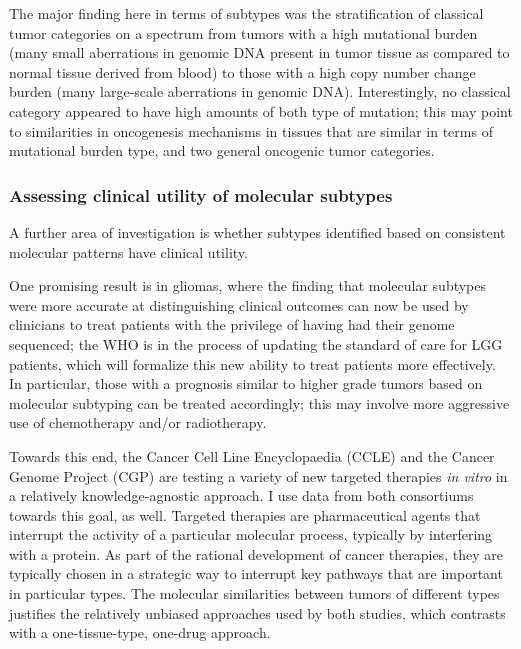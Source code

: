         The major finding here in terms of subtypes was the stratification of
        classical tumor categories on a spectrum from tumors with a high
        mutational burden (many small aberrations in genomic DNA present in
        tumor tissue as compared to normal tissue derived from blood) to those
        with a high copy number change burden (many large-scale aberrations in
        genomic DNA). Interestingly, no classical category appeared to have
        high amounts of both type of mutation; this may point to similarities
        in oncogenesis mechanisms in tissues that are similar in terms of
        mutational burden type, and two general oncogenic tumor
        categories.
        
        \subsubsection{Assessing clinical utility of molecular subtypes}

        A further area of investigation is whether subtypes identified
        based on consistent molecular patterns have clinical utility.

        
        One promising result is in gliomas, where the finding that molecular subtypes were more
        accurate at distinguishing clinical outcomes can now be used by
        clinicians to treat patients with the privilege of having had
        their genome sequenced; the WHO is in the process of updating
        the standard of care for LGG patients, which will formalize
        this new ability to treat patients more effectively. In
        particular, those with a prognosis similar to higher grade
      tumors based on molecular subtyping can be treated
        accordingly; this may involve more aggressive use of
        chemotherapy and/or radiotherapy.

        Towards this end, the Cancer Cell Line
        Encyclopaedia (CCLE)\cite{barretina_cancer_2012} and the Cancer
        Genome Project (CGP) \cite{garnett_systematic_2012}are testing a variety
        of new targeted therapies \textit{in vitro} in a relatively knowledge-agnostic
        approach. I use data from both consortiums towards this goal,
        as well. Targeted therapies are pharmaceutical agents that
        interrupt the activity of a particular molecular process,
        typically by interfering with a protein. As part of the
        rational development of cancer therapies, they are typically
        chosen in a strategic way to interrupt key pathways that are
        important in particular types. The molecular similarities
        between tumors of different types justifies the relatively
        unbiased approaches used by both studies, which contrasts with
        a one-tissue-type, one-drug approach.
        
